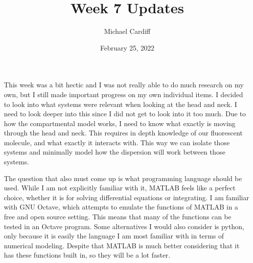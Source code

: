 \documentclass[12pt]{article}
\title{Week 7 Updates}
\author{Michael Cardiff}
\date{February 25, 2022}
\begin{document}
\maketitle
This week was a bit hectic and I was not really able to do much research on my own, but I still made important progress on my own individual items. I decided to look into what systems were relevant when looking at the head and neck. I need to look deeper into this since I did not get to look into it too much. Due to how the compartmental model works, I need to know what exactly is moving through the head and neck. This requires in depth knowledge of our fluorescent molecule, and what exactly it interacts with. This way we can isolate those systems and minimally model how the dispersion will work between those systems.

The question that also must come up is what programming language should be used. While I am not explicitly familiar with it, MATLAB feels like a perfect choice, whether it is for solving differential equations or integrating. I am familiar with GNU Octave, which attempts to emulate the functions of MATLAB in a free and open source setting. This means that many of the functions can be tested in an Octave program. Some alternatives I would also consider is python, only because it is easily the language I am most familiar with in terms of numerical modeling. Despite that MATLAB is much better considering that it has these functions built in, so they will be a lot faster. 
\end{document}
